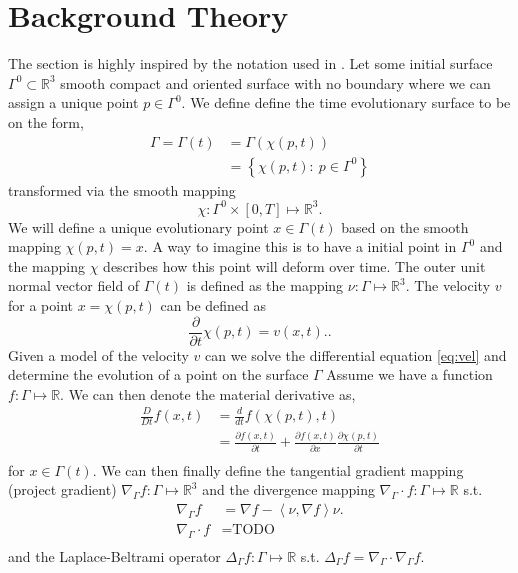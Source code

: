 

\section{Background Theory}%
\label{sec:differential_geometry}

The section is highly inspired by the notation used in \cite{kovacs2021convergent}.
Let some initial surface $\Gamma^{0} \subset \mathbb{R} ^3  $ smooth compact and oriented surface with no boundary where we can assign a unique point $p \in \Gamma ^{0}$. We define define the time evolutionary surface to be on the form,
\[
    \begin{split}
\Gamma  = \Gamma \left( t \right) & = \Gamma \left( \chi \left( p,t \right)  \right) \\
                                  &= \left\{ \chi \left( p,t \right): \ p \in \Gamma^{0}  \right\}
    \end{split}
\]
transformed via the smooth mapping
\[
\chi : \Gamma^{0} \times  \left[ 0,T \right]  \mapsto  \mathbb{R} ^3.
\]
We will define a unique evolutionary point $x \in \Gamma \left( t \right) $ based on the smooth mapping $\chi \left( p,t \right) = x$. A way to imagine this is to have a initial point in $\Gamma ^{0}$ and the mapping $\chi $ describes how this point will deform over time. The outer unit normal vector field of $\Gamma \left( t \right) $ is defined as the mapping $\nu : \Gamma \mapsto
\mathbb{R} ^{3}$. The velocity $v$ for a point $x = \chi \left( p,t \right) $ can be defined as
\begin{equation}
    \label{eq:vel}
\frac{\partial }{\partial  t}  \chi \left( p,t \right)  = v\left( x,t \right).
.\end{equation}
Given a model of the velocity $v$ can we solve the differential equation \eqref{eq:vel} and determine the evolution of a point on the surface $\Gamma $
Assume we have a function $f: \Gamma \mapsto \mathbb{R}  $. We can then denote the material derivative as,
\[
    \begin{split}
\frac{D}{Dt}  f\left( x,t \right)  & = \frac{d}{dt} f \left( \chi \left( p,t \right) , t \right) \\
&= \frac{\partial f\left( x,t \right) }{\partial  t} + \frac{\partial f\left( x,t \right) }{\partial  x}  \frac{\partial \chi \left( p,t \right) }{\partial  t}   \\
    \end{split}
\]
for $x \in \Gamma \left( t \right)  $.
We can then finally define the tangential gradient mapping (project gradient) $\nabla _{\Gamma } f: \Gamma \mapsto \mathbb{R} ^{3}$ and the divergence mapping $\nabla _{\Gamma } \cdot  f: \Gamma \mapsto \mathbb{R} $ s.t.
\[
\begin{split}
\nabla_{\Gamma } f & = \nabla f - \left<\nu, \nabla f \right> \nu. \\
\nabla_{\Gamma } \cdot f &= \text{TODO}  \\
\end{split}
\]
and the Laplace-Beltrami operator $\Delta _{\Gamma }f: \Gamma \mapsto \mathbb{R}$ s.t. $ \Delta _{\Gamma } f  = \nabla _{\Gamma } \cdot  \nabla _{\Gamma }f$.


